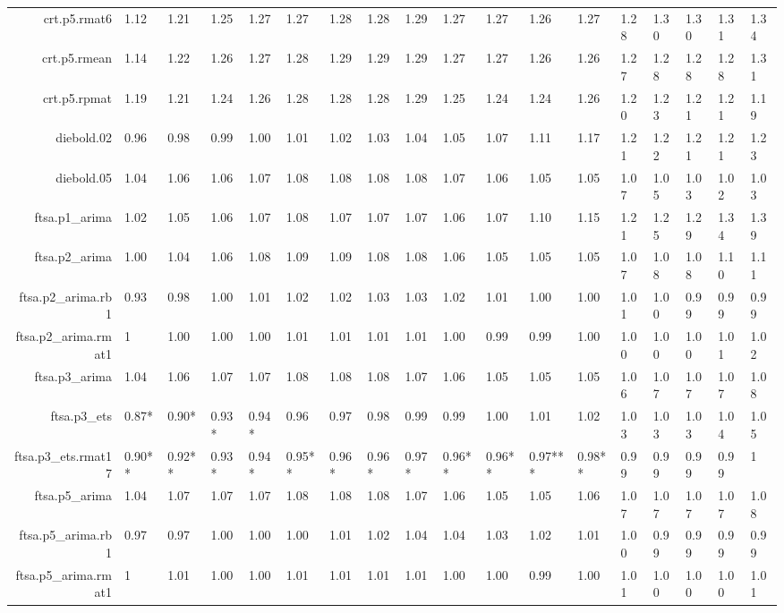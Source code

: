 \begin{table}[ht]
{\begin{tabular}{rlllllllllllllllll}
  crt.p5.rmat6 & 1.12 & 1.21 & 1.25 & 1.27 & 1.27 & 1.28 & 1.28 & 1.29 & 1.27 & 1.27 & 1.26 & 1.27 & 1.28 & 1.30 & 1.30 & 1.31 & 1.34 \\ 
  crt.p5.rmean & 1.14 & 1.22 & 1.26 & 1.27 & 1.28 & 1.29 & 1.29 & 1.29 & 1.27 & 1.27 & 1.26 & 1.26 & 1.27 & 1.28 & 1.28 & 1.28 & 1.31 \\ 
  crt.p5.rpmat & 1.19 & 1.21 & 1.24 & 1.26 & 1.28 & 1.28 & 1.28 & 1.29 & 1.25 & 1.24 & 1.24 & 1.26 & 1.20 & 1.23 & 1.21 & 1.21 & 1.19 \\ 
  diebold.02 & 0.96 & 0.98 & 0.99 & 1.00 & 1.01 & 1.02 & 1.03 & 1.04 & 1.05 & 1.07 & 1.11 & 1.17 & 1.21 & 1.22 & 1.21 & 1.21 & 1.23 \\ 
  diebold.05 & 1.04 & 1.06 & 1.06 & 1.07 & 1.08 & 1.08 & 1.08 & 1.08 & 1.07 & 1.06 & 1.05 & 1.05 & 1.07 & 1.05 & 1.03 & 1.02 & 1.03 \\ 
  ftsa.p1\_arima & 1.02 & 1.05 & 1.06 & 1.07 & 1.08 & 1.07 & 1.07 & 1.07 & 1.06 & 1.07 & 1.10 & 1.15 & 1.21 & 1.25 & 1.29 & 1.34 & 1.39 \\ 
  ftsa.p2\_arima & 1.00 & 1.04 & 1.06 & 1.08 & 1.09 & 1.09 & 1.08 & 1.08 & 1.06 & 1.05 & 1.05 & 1.05 & 1.07 & 1.08 & 1.08 & 1.10 & 1.11 \\ 
  ftsa.p2\_arima.rb1 & 0.93 & 0.98 & 1.00 & 1.01 & 1.02 & 1.02 & 1.03 & 1.03 & 1.02 & 1.01 & 1.00 & 1.00 & 1.01 & 1.00 & 0.99 & 0.99 & 0.99 \\ 
  ftsa.p2\_arima.rmat1 & 1 & 1.00 & 1.00 & 1.00 & 1.01 & 1.01 & 1.01 & 1.01 & 1.00 & 0.99 & 0.99 & 1.00 & 1.00 & 1.00 & 1.00 & 1.01 & 1.02 \\ 
  ftsa.p3\_arima & 1.04 & 1.06 & 1.07 & 1.07 & 1.08 & 1.08 & 1.08 & 1.07 & 1.06 & 1.05 & 1.05 & 1.05 & 1.06 & 1.07 & 1.07 & 1.07 & 1.08 \\ 
  ftsa.p3\_ets & 0.87* & 0.90* & 0.93* & 0.94* & 0.96 & 0.97 & 0.98 & 0.99 & 0.99 & 1.00 & 1.01 & 1.02 & 1.03 & 1.03 & 1.03 & 1.04 & 1.05 \\ 
  ftsa.p3\_ets.rmat17 & 0.90** & 0.92** & 0.93* & 0.94* & 0.95** & 0.96* & 0.96* & 0.97* & 0.96** & 0.96** & 0.97*** & 0.98** & 0.99 & 0.99 & 0.99 & 0.99 & 1 \\ 
  ftsa.p5\_arima & 1.04 & 1.07 & 1.07 & 1.07 & 1.08 & 1.08 & 1.08 & 1.07 & 1.06 & 1.05 & 1.05 & 1.06 & 1.07 & 1.07 & 1.07 & 1.07 & 1.08 \\ 
  ftsa.p5\_arima.rb1 & 0.97 & 0.97 & 1.00 & 1.00 & 1.00 & 1.01 & 1.02 & 1.04 & 1.04 & 1.03 & 1.02 & 1.01 & 1.00 & 0.99 & 0.99 & 0.99 & 0.99 \\ 
  ftsa.p5\_arima.rmat1 & 1 & 1.01 & 1.00 & 1.00 & 1.01 & 1.01 & 1.01 & 1.01 & 1.00 & 1.00 & 0.99 & 1.00 & 1.01 & 1.00 & 1.00 & 1.00 & 1.01 \\ 

\end{tabular}}
\end{table}
